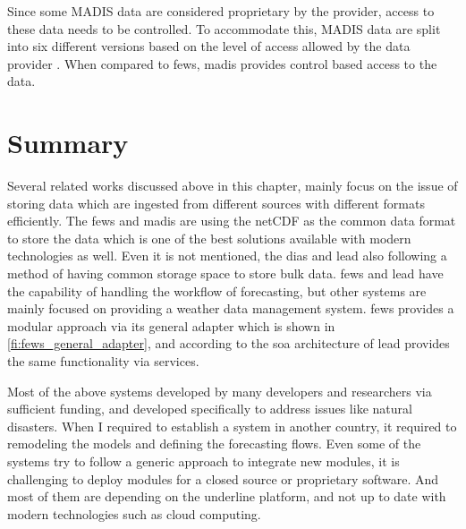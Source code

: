 Since some MADIS data are considered proprietary by the provider, access to these data needs to be controlled. To accommodate this, MADIS data are split into six different versions based on the level of access allowed by the data provider \cite{Macdermaid2005ARCHITECTUREP2.39}. When compared to \acrshort{fews}, \acrshort{madis} provides control based access to the data.



\section{Summary}
\label{se:lit_summary}
Several related works discussed above in this chapter, mainly focus on the issue of storing data which are ingested from different sources with different formats efficiently. The \acrshort{fews} and \acrshort{madis} are using the \acrshort{netCDF} as the common data format to store the data which is one of the best solutions available with modern technologies as well. Even it is not mentioned, the \acrshort{dias} and \acrshort{lead} also following a method of having common storage space to store bulk data.
\acrshort{fews} and \acrshort{lead} have the capability of handling the workflow of forecasting, but other systems are mainly focused on providing a weather data management system.
\acrshort{fews} provides a modular approach via its general adapter which is shown in \cref{fi:fews_general_adapter}, and according to the \acrshort{soa} architecture of \acrshort{lead} provides the same functionality via services.

Most of the above systems developed by many developers and researchers via sufficient funding, and developed specifically to address issues like natural disasters. When I required to establish a system in another country, it required to remodeling the models and defining the forecasting flows. Even some of the systems try to follow a generic approach to integrate new modules, it is challenging to deploy modules for a closed source or proprietary software. And most of them are depending on the underline platform, and not up to date with modern technologies such as cloud computing.
